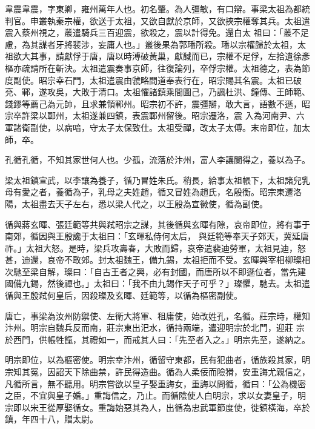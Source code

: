 \begin{pinyinscope}
 韋震韋震，字東卿，雍州萬年人也。初名肇。為人彊敏，有口辯。事梁太祖為都統判官。申叢執秦宗權，欲送于太祖，又欲自獻於京師，又欲挾宗權奪其兵。太祖遣震入蔡州視之，叢遣騎兵三百迎震，欲殺之，震以計得免。還白太
 祖曰：「叢不足慮，為其謀者牙將裴涉，妄庸人也。」叢後果為郭璠所殺。璠以宗權歸於太祖，太祖欲大其事，請獻俘于唐，唐以時溥破黃巢，獻馘而已，宗權不足俘，左拾遺徐彥樞亦疏請所在斬決。太祖遣震奏事京師，往復論列，卒俘宗權。太祖德之，表為節度副使。昭宗幸石門，太祖遣震由虢略間道奉表行在，昭宗賜其名震。太祖已破兗、鄆，遂攻吳，大敗于清口。太祖懼諸鎮乘間圖己，乃諷杜洪、鐘傳、王師範、錢鏐等薦己為元帥，且求兼領鄆州。昭宗初不許，震彊辯，敢大言，語數不遜，昭宗卒許梁以鄆州，太祖遂兼四鎮，表震鄆州留後。昭宗遷洛，震
 入為河南尹、六軍諸衛副使，以病喑，守太子太保致仕。太祖受禪，改太子太傅。末帝即位，加太師，卒。



 孔循孔循，不知其家世何人也。少孤，流落於汴州，富人李讓闌得之，養以為子。



 梁太祖鎮宣武，以李讓為養子，循乃冒姓朱氏。稍長，給事太祖帳下，太祖諸兒乳母有愛之者，養循為子，乳母之夫姓趙，循又冒姓為趙氏，名殷衡。昭宗東遷洛陽，太祖盡去天子左右，悉以梁人代之，以王殷為宣徽使，循為副使。



 循與蔣玄暉、張廷範等共與弒昭宗之謀，其後循與玄暉有隙，哀帝即位，將有事于南郊，循因與王殷讒于太祖曰：「玄暉私侍何太后，
 與廷範等奉天子郊天，冀延唐祚。」太祖大怒。是時，梁兵攻壽春，大敗而歸，哀帝遣裴迪勞軍，太祖見迪，怒甚，迪還，哀帝不敢郊。封太祖魏王，備九錫，太祖拒而不受。玄暉與宰相柳璨相次馳至梁自解，璨曰：「自古王者之興，必有封國，而唐所以不即遜位者，當先建國備九錫，然後禪也。」太祖曰：「我不由九錫作天子可乎？」璨懼，馳去。太祖遣循與王殷弒何皇后，因殺璨及玄暉、廷範等，以循為樞密副使。



 唐亡，事梁為汝州防禦使、左衛大將軍、租庸使，始改姓孔，名循。莊宗時，權知汴州。明宗自魏兵反而南，莊宗東出汜水，循持兩端，遣迎明宗於北門，迎莊
 宗於西門，供帳牲餼，其禮如一，而戒其人曰：「先至者入之。」明宗先至，遂納之。



 明宗即位，以為樞密使。明宗幸汴州，循留守東都，民有犯曲者，循族殺其家，明宗知其冤，因詔天下除曲禁，許民得造曲。循為人柔佞而險猾，安重誨尤親信之，凡循所言，無不聽用。明宗嘗欲以皇子娶重誨女，重誨以問循，循曰：「公為機密之臣，不宜與皇子婚。」重誨信之，乃止。而循陰使人白明宗，求以女妻皇子，明宗即以宋王從厚娶循女。重誨始惡其為人，出循為忠武軍節度使，徙鎮橫海，卒於鎮，年四十八，贈太尉。




\end{pinyinscope}
